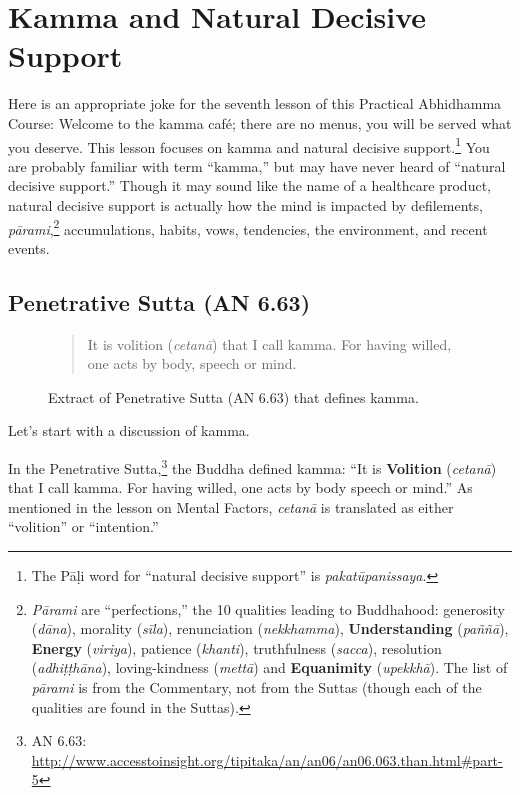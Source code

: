 \section{Kamma and Natural Decisive Support}

Here is an appropriate joke for the seventh lesson of this Practical Abhidhamma Course: Welcome to the kamma café; there are no menus, you will be served what you deserve. This lesson focuses on kamma and natural decisive support.\footnote{The Pāḷi word for “natural decisive support” is \textit{pakatūpanissaya}.} You are probably familiar with term “kamma,” but may have never heard of “natural decisive support.” Though it may sound like the name of a healthcare product, natural decisive support is actually how the mind is impacted by defilements, \textit{pārami},\footnote{\textit{Pārami} are “perfections,” the 10 qualities leading to Buddhahood: generosity (\textit{dāna}), morality (\textit{sīla}), renunciation (\textit{nekkhamma}), \textbf{Understanding} (\textit{paññā}), \textbf{Energy} (\textit{viriya}), patience (\textit{khanti}), truthfulness (\textit{sacca}), resolution (\textit{adhiṭṭhāna}), loving-kindness (\textit{mettā}) and \textbf{Equanimity} (\textit{upekkhā}). The list of \textit{pārami} is from the Commentary, not from the Suttas (though each of the qualities are found in the Suttas).} accumulations, habits, vows, tendencies, the environment, and recent events.

\subsection*{Penetrative Sutta (AN 6.63)}

\begin{figure}[H]
\begin{quotation}
It is volition (\textit{cetanā}) that I call kamma. For having willed, one acts by body, speech or mind.
\end{quotation}
\caption{Extract of Penetrative Sutta (AN 6.63) that defines kamma.}
\label{fig:AN6_63}
\end{figure}

Let's start with a discussion of kamma. 

In the Penetrative Sutta,\footnote{AN 6.63: \url{http://www.accesstoinsight.org/tipitaka/an/an06/an06.063.than.html\#part-5}} the Buddha defined kamma: “It is \textbf{Volition} (\textit{cetanā}) that I call kamma. For having willed, one acts by body speech or mind.” As mentioned in the lesson on Mental Factors, \textit{cetanā} is translated as either “volition” or “intention.”

